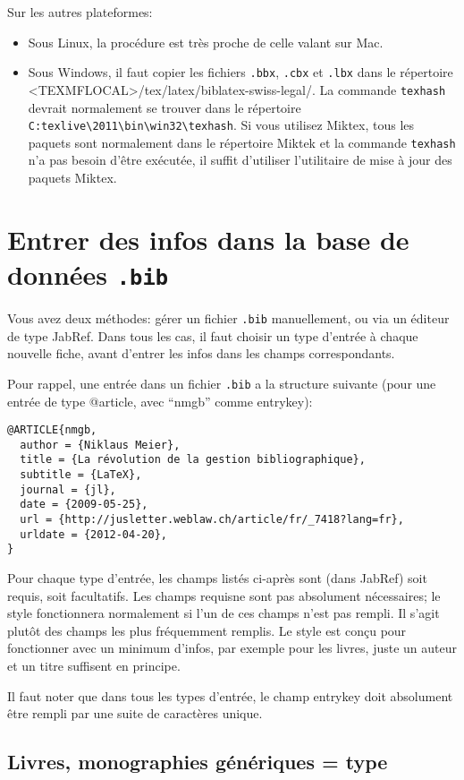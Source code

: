 \documentclass[a4paper]{ltxdockit}[2011/03/25]
\newcommand{\bib}{\texttt{.bib}\xspace}
\newcommand{\bbx}{\texttt{.bbx}\xspace}
\newcommand{\cbx}{\texttt{.cbx}\xspace}
\newcommand{\lbx}{\texttt{.lbx}\xspace}
\newcommand{\GM}{\enquote}
\newcommand{\pex}{\textnormal{par exemple}\xspace}
\begin{document}
Sur les autres plateformes:
\begin{itemize}
\item Sous Linux, la procédure est très proche de celle valant sur Mac.
\item Sous Windows, il faut copier les fichiers \bbx, \cbx et \lbx dans le répertoire
<TEXMFLOCAL>/\-tex/latex/biblatex-swiss-legal/.
La commande \verb/texhash/ devrait normalement se trouver dans le répertoire \verb/C:texlive\2011\bin\win32\texhash/. Si vous utilisez Miktex, tous les paquets sont normalement dans le répertoire Miktek et la commande \verb/texhash/ n'a pas besoin d'être exécutée, il suffit d'utiliser l'utilitaire de mise à jour des paquets Miktex.
\end{itemize}




\section{Entrer des infos dans la base de données \bib}
\label{bib}

Vous avez deux méthodes: gérer un fichier \bib manuellement, ou via un éditeur de type JabRef. Dans tous les cas, il faut choisir un type d'entrée à chaque nouvelle fiche, avant d'entrer les infos dans les champs correspondants.

Pour rappel, une entrée dans un fichier \bib a la structure suivante (pour une entrée de type @article, avec \GM{nmgb} comme entrykey):
\begin{verbatim}
@ARTICLE{nmgb,
  author = {Niklaus Meier},
  title = {La révolution de la gestion bibliographique},
  subtitle = {LaTeX},
  journal = {jl},
  date = {2009-05-25},
  url = {http://jusletter.weblaw.ch/article/fr/_7418?lang=fr},
  urldate = {2012-04-20},
}
\end{verbatim}


Pour chaque type d'entrée, les champs listés ci-après sont (dans JabRef) soit requis, soit facultatifs. Les champs \og requis\fg ne sont pas absolument nécessaires; le style fonctionnera normalement si l'un de ces champs n'est pas rempli. Il s'agit plutôt des champs les plus fréquemment remplis. Le style est conçu pour fonctionner avec un minimum d'infos, \pex pour les livres, juste un auteur et un titre suffisent en principe.

Il faut noter que dans tous les types d'entrée, le champ entrykey doit absolument être rempli par une suite de caractères unique.

\subsection{Livres, monographies génériques = type }
\end{document}
